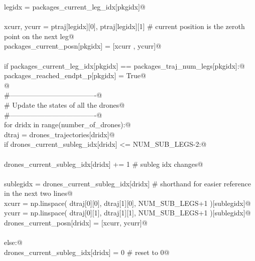 \documentclass[10.0pt]{report}
\begin{document}
\begin{appendices}
\begin{flushleft}
\begin{list}{}{}
\mbox{}\verb@                    legidx    = packages_current_leg_idx[pkgidx]@\\
\mbox{}\verb@@\\
\mbox{}\verb@                    xcurr, ycurr = ptraj[legidx][0], ptraj[legidx][1] # current position is the zeroth point on the next leg@\\
\mbox{}\verb@                    packages_current_posn[pkgidx]  = [xcurr , ycurr]@\\
\mbox{}\verb@@\\
\mbox{}\verb@                    if packages_current_leg_idx[pkgidx] == packages_traj_num_legs[pkgidx]:@\\
\mbox{}\verb@                        packages_reached_endpt_p[pkgidx] = True@\\
\mbox{}\verb@ @\\
\mbox{}\verb@        #-------------------------------------@\\
\mbox{}\verb@        # Update the states of all the drones@\\
\mbox{}\verb@        #-------------------------------------@\\
\mbox{}\verb@        for dridx in range(number_of_drones):@\\
\mbox{}\verb@                  dtraj = drones_trajectories[dridx]@\\
\mbox{}\verb@                  if drones_current_subleg_idx[dridx] <= NUM_SUB_LEGS-2:@\\
\mbox{}\verb@@\\
\mbox{}\verb@                    drones_current_subleg_idx[dridx] += 1     # subleg idx changes@\\
\mbox{}\verb@@\\
\mbox{}\verb@                    sublegidx = drones_current_subleg_idx[dridx] # shorthand for easier reference in the next two lines@\\
\mbox{}\verb@                    xcurr = np.linspace( dtraj[0][0], dtraj[1][0], NUM_SUB_LEGS+1 )[sublegidx]@\\
\mbox{}\verb@                    ycurr = np.linspace( dtraj[0][1], dtraj[1][1], NUM_SUB_LEGS+1 )[sublegidx]@\\
\mbox{}\verb@                    drones_current_posn[dridx]  = [xcurr, ycurr]@\\
\mbox{}\verb@@\\
\mbox{}\verb@                  else:@\\
\mbox{}\verb@                    drones_current_subleg_idx[dridx] = 0 # reset to 0@\\

\end{list}
\end{flushleft}
\end{appendices}
\end{document}
